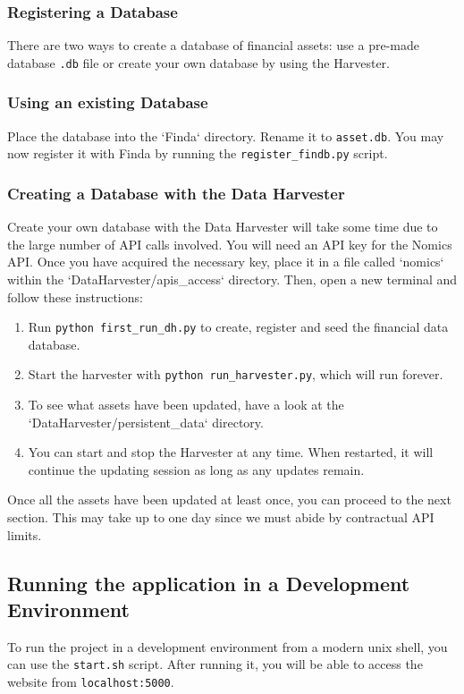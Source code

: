 \documentclass[main.tex]{subfiles}
\begin{document}
\subsubsection{Registering a Database}

There are two ways to create a database of financial assets: use a pre-made database \texttt{.db} file or create your own database by using the Harvester.

\subsubsection*{Using an existing Database}
\label{existing-db-instructions}

Place the database into the `Finda` directory. Rename it to \texttt{asset.db}. You may now register it with Finda by running the \texttt{register\_findb.py} script.

\subsubsection*{Creating a Database with the Data Harvester}
\label{make-your-own-db-instructions}

Create your own database with the Data Harvester will take some time due to the large number of API calls involved. You will need an API key for the Nomics API. Once you have acquired the necessary key, place it in a file called `nomics` within the `DataHarvester/apis\_access` directory. Then, open a new terminal and follow these instructions:
\begin{enumerate}
  \item Run \texttt{python\ first\_run\_dh.py} to create, register and seed the financial data database.
\item
  Start the harvester with \texttt{python\ run\_harvester.py},
  which will run forever.
\item
  To see what assets have been updated, have a look at the
  `DataHarvester/persistent\_data` directory.
\item
  You can start and stop the Harvester at any time. When
  restarted, it will continue the updating session as long as any updates remain.
\end{enumerate}
Once all the assets have been updated at least once, you can proceed to the next section. This may take up to one day since we must abide by contractual API limits.

\subsection{Running the application in a Development Environment}
  To run the project in a development environment from a modern unix shell, you can use the \texttt{start.sh} script. After running it, you will be able to access the website from \texttt{localhost:5000}.
\end{document}
